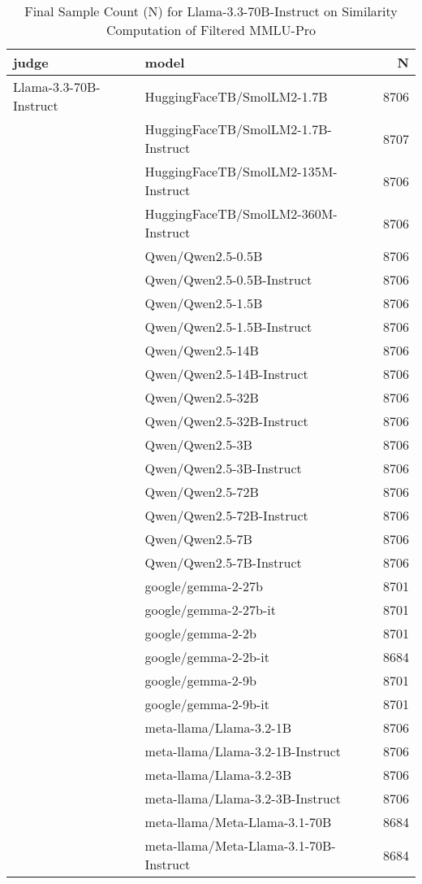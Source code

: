 \begin{table}[]
    \centering
     \caption{Final Sample Count (N) for Llama-3.3-70B-Instruct on Similarity Computation of Filtered MMLU-Pro}
\begin{tabular}{llr}
\toprule
judge & model & N \\
\midrule
Llama-3.3-70B-Instruct & HuggingFaceTB/SmolLM2-1.7B & 8706 \\
 & HuggingFaceTB/SmolLM2-1.7B-Instruct & 8707 \\
 & HuggingFaceTB/SmolLM2-135M-Instruct & 8706 \\
 & HuggingFaceTB/SmolLM2-360M-Instruct & 8706 \\
 & Qwen/Qwen2.5-0.5B & 8706 \\
 & Qwen/Qwen2.5-0.5B-Instruct & 8706 \\
 & Qwen/Qwen2.5-1.5B & 8706 \\
 & Qwen/Qwen2.5-1.5B-Instruct & 8706 \\
 & Qwen/Qwen2.5-14B & 8706 \\
 & Qwen/Qwen2.5-14B-Instruct & 8706 \\
 & Qwen/Qwen2.5-32B & 8706 \\
 & Qwen/Qwen2.5-32B-Instruct & 8706 \\
 & Qwen/Qwen2.5-3B & 8706 \\
 & Qwen/Qwen2.5-3B-Instruct & 8706 \\
 & Qwen/Qwen2.5-72B & 8706 \\
 & Qwen/Qwen2.5-72B-Instruct & 8706 \\
 & Qwen/Qwen2.5-7B & 8706 \\
 & Qwen/Qwen2.5-7B-Instruct & 8706 \\
 & google/gemma-2-27b & 8701 \\
 & google/gemma-2-27b-it & 8701 \\
 & google/gemma-2-2b & 8701 \\
 & google/gemma-2-2b-it & 8684 \\
 & google/gemma-2-9b & 8701 \\
 & google/gemma-2-9b-it & 8701 \\
 & meta-llama/Llama-3.2-1B & 8706 \\
 & meta-llama/Llama-3.2-1B-Instruct & 8706 \\
 & meta-llama/Llama-3.2-3B & 8706 \\
 & meta-llama/Llama-3.2-3B-Instruct & 8706 \\
 & meta-llama/Meta-Llama-3.1-70B & 8684 \\
 & meta-llama/Meta-Llama-3.1-70B-Instruct & 8684 \\

\end{tabular}
\end{table}
